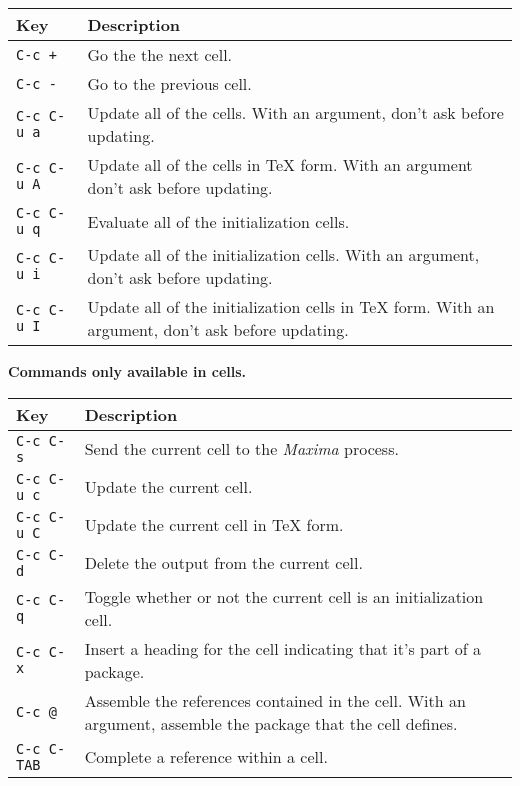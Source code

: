 \documentclass{article}
\newcommand{\mx}{\textsl{\sffamily Maxima}}
\begin{document}
\noindent
\begin{tabular}{p{\firstcol}p{\secondcol}}
\hline
\textbf{Key} & \textbf{Description}\\
\hline
\texttt{C-c +} & Go the the next cell.\\
\texttt{C-c -} & Go to the previous cell.\\
\texttt{C-c C-u a} & 
Update all of the cells.  With an argument, don't ask before updating.\\
\texttt{C-c C-u A}
& Update all of the cells in \TeX{} form. With an argument don't ask
before updating.\\
\texttt{C-c C-u q}
& Evaluate all of the initialization cells.\\
\texttt{C-c C-u i}
& Update all of the initialization cells.  With an argument, don't
ask before updating.\\
\texttt{C-c C-u I}
& Update all of the initialization cells in \TeX{} form.  With an
argument, don't ask before updating.
\end{tabular}

\smallskip

\noindent
\textbf{Commands only available in cells.}

\smallskip

\noindent
\begin{tabular}{p{\firstcol}p{\secondcol}}
\hline
\textbf{Key} & \textbf{Description}\\
\hline
\texttt{C-c C-s}
& Send the current cell to the \mx{} process.\\
\texttt{C-c C-u c}
& Update the current cell.\\
\texttt{C-c C-u C}
& Update the current cell in \TeX{} form.\\
\texttt{C-c C-d}
& Delete the output from the current cell.\\
\texttt{C-c C-q}
& Toggle whether or not the current cell is an initialization cell.\\
\texttt{C-c C-x}
& Insert a heading for the cell indicating that it's part of a
package. \\
\texttt{C-c @}
& Assemble the references contained in the cell.  With an argument,
assemble the package that the cell defines.\\
\texttt{C-c C-\texttt{TAB}}
& Complete a reference within a cell.
\end{tabular}
\end{document}
